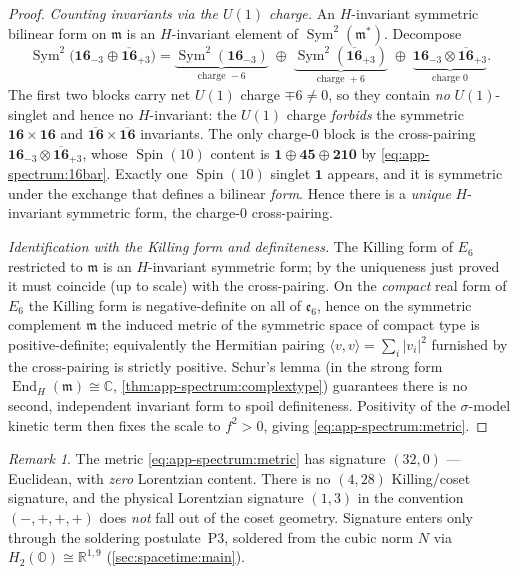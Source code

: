 \documentclass[11pt]{article}
\theoremstyle{plain}
\theoremstyle{definition}
\theoremstyle{remark}
\newtheorem{remark}[theorem]{Remark}
\newcommand{\Spin}{\operatorname{Spin}}
\newcommand{\End}{\operatorname{End}}
\newcommand{\Sym}{\operatorname{Sym}}
\begin{document}
\begin{proof}
\emph{Counting invariants via the $U(1)$ charge.} An $H$-invariant
symmetric bilinear form on $\mathfrak m$ is an $H$-invariant element of
$\Sym^2(\mathfrak m^\ast)$. Decompose
\[
  \Sym^2\bigl(\mathbf{16}_{-3}\oplus\overline{\mathbf{16}}_{+3}\bigr)
   = \underbrace{\Sym^2(\mathbf{16}_{-3})}_{\text{charge }-6}
   \;\oplus\;
   \underbrace{\Sym^2(\overline{\mathbf{16}}_{+3})}_{\text{charge }+6}
   \;\oplus\;
   \underbrace{\mathbf{16}_{-3}\otimes\overline{\mathbf{16}}_{+3}}_{\text{charge }0}.
\]
The first two blocks carry net $U(1)$ charge $\mp6\neq0$, so they contain
\emph{no} $U(1)$-singlet and hence no $H$-invariant: the $U(1)$ charge
\emph{forbids} the symmetric $\mathbf{16}\times\mathbf{16}$ and
$\overline{\mathbf{16}}\times\overline{\mathbf{16}}$ invariants. The only
charge-$0$ block is the cross-pairing
$\mathbf{16}_{-3}\otimes\overline{\mathbf{16}}_{+3}$, whose $\Spin(10)$
content is $\mathbf 1\oplus\mathbf{45}\oplus\mathbf{210}$ by
\eqref{eq:app-spectrum:16bar}. Exactly one $\Spin(10)$ singlet $\mathbf 1$
appears, and it is symmetric under the exchange that defines a bilinear
\emph{form}. Hence there is a \emph{unique} $H$-invariant symmetric form,
the charge-$0$ cross-pairing.

\emph{Identification with the Killing form and definiteness.} The Killing
form of $E_6$ restricted to $\mathfrak m$ is an $H$-invariant symmetric
form; by the uniqueness just proved it must coincide (up to scale) with
the cross-pairing. On the \emph{compact} real form of $E_6$ the Killing
form is negative-definite on all of $\mathfrak e_6$, hence on the symmetric
complement $\mathfrak m$ the induced metric of the symmetric space of
compact type is positive-definite; equivalently the Hermitian pairing
$\langle v,v\rangle=\sum_i|v_i|^2$ furnished by the cross-pairing is
strictly positive. Schur's lemma (in the strong form
$\End_H(\mathfrak m)\cong\mathbb C$, \autoref{thm:app-spectrum:complextype})
guarantees there is no second, independent invariant form to spoil
definiteness. Positivity of the $\sigma$-model kinetic term then fixes the
scale to $f^2>0$, giving \eqref{eq:app-spectrum:metric}.
\end{proof}

\begin{remark}\label{rem:app-spectrum:nolorentz}
The metric \eqref{eq:app-spectrum:metric} has signature $(32,0)$ ---
Euclidean, with \emph{zero} Lorentzian content. There is no $(4,28)$
Killing/coset signature, and the physical Lorentzian signature $(1,3)$ in
the convention $(-,+,+,+)$ does \emph{not} fall out of the coset geometry.
Signature enters only through the soldering postulate~P3, soldered from the
cubic norm $N$ via $H_2(\mathbb O)\cong\mathbb R^{1,9}$
(\autoref{sec:spacetime:main}).
\end{remark}
\end{document}
